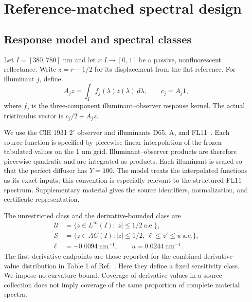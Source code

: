 \documentclass{optica-article}
\begin{document}
\section{Reference-matched spectral design}
\subsection{Response model and spectral classes}
Let $I=[380,780]$ nm and let $r:I\to[0,1]$ be a passive, nonfluorescent reflectance. Write $z=r-1/2$ for its displacement from the flat reference. For illuminant $j$, define
\begin{equation}
 A_j z=\int_I f_j(\lambda)z(\lambda)\,d\lambda,
 \qquad c_j=A_j1,
 \label{eq:response}
\end{equation}
where $f_j$ is the three-component illuminant--observer response kernel. The actual tristimulus vector is $c_j/2+A_jz$.

We use the CIE 1931 $2^\circ$ observer and illuminants D65, A, and FL11~\cite{CIEObserver,CIED65,CIEA,CIEFL}. Each source function is specified by piecewise-linear interpolation of the frozen tabulated values on the 1 nm grid. Illuminant--observer products are therefore piecewise quadratic and are integrated as products. Each illuminant is scaled so that the perfect diffuser has $Y=100$. The model treats the interpolated functions as its exact inputs; this convention is especially relevant to the structured FL11 spectrum. Supplementary material gives the source identifiers, normalization, and certificate representation.

The unrestricted class and the derivative-bounded class are
\begin{align}
 \mathcal U&=\{z\in L^\infty(I): |z|\leq1/2\ \text{a.e.}\},\label{eq:U}\\
 \mathcal S&=\{z\in AC(I): |z|\leq1/2,\ \ell\leq z'\leq u\ \text{a.e.}\},\label{eq:S}\\
 \ell&=-0.0094\ \mathrm{nm}^{-1},\qquad u=0.0244\ \mathrm{nm}^{-1}.\nonumber
\end{align}
The first-derivative endpoints are those reported for the combined derivative-value distribution in Table 1 of Ref.~\cite{Flinkman2012}. Here they define a fixed sensitivity class. We impose no curvature bound. Coverage of derivative values in a source collection does not imply coverage of the same proportion of complete material spectra.
\end{document}
